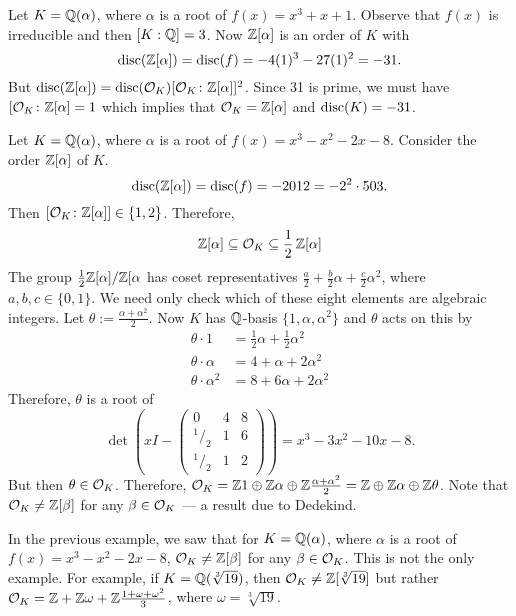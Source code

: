 \begin{ex}
Let $K=\mathbb{Q}(\alpha)$, where $\alpha$ is a root of $f(x)=x^3+x+1$. Observe that $f(x)$ is irreducible and then $[K:\mathbb{Q}]=3$. Now $\mathbb{Z}[\alpha]$ is an order of $K$ with 
	\[
	\operatorname{disc}(\mathbb{Z}[\alpha])= \operatorname{disc}(f)= -4(1)^3 - 27(1)^2= -31.
	\]
But $\operatorname{disc}(\mathbb{Z}[\alpha])= \operatorname{disc}(\mathcal{O}_K) [\mathcal{O}_K \colon \mathbb{Z}[\alpha]]^2$. Since 31 is prime, we must have $[\mathcal{O}_K \colon \mathbb{Z}[\alpha]=1$ which implies that $\mathcal{O}_K=\mathbb{Z}[\alpha]$ and $\operatorname{disc}(K)= -31$. \xqed \pskip
\end{ex}


\begin{ex}
Let $K=\mathbb{Q}(\alpha)$, where $\alpha$ is a root of $f(x)= x^3-x^2-2x-8$. Consider the order $\mathbb{Z}[\alpha]$ of $K$. 
	\[
	\operatorname{disc}(\mathbb{Z}[\alpha])= \operatorname{disc}(f)= -2012= -2^2 \cdot 503.
	\]
Then $[\mathcal{O}_K \colon \mathbb{Z}[\alpha]] \in \{1,2\}$. Therefore,
	\[
	\mathbb{Z}[\alpha] \subseteq \mathcal{O}_K \subseteq \dfrac{1}{2} \, \mathbb{Z}[\alpha]
	\]
The group $\frac{1}{2}\mathbb{Z}[\alpha]/\mathbb{Z}[\alpha$ has coset representatives $\frac{a}{2} + \frac{b}{2} \alpha + \frac{c}{2} \alpha^2$, where $a,b,c \in \{0,1\}$. We need only check which of these eight elements are algebraic integers. Let $\theta:= \frac{\alpha + \alpha^2}{2}$. Now $K$ has $\mathbb{Q}$-basis $\{1,\alpha,\alpha^2\}$ and $\theta$ acts on this by
	\[
	\begin{split}
	\theta \cdot 1&= \frac{1}{2} \alpha + \frac{1}{2} \alpha^2 \\
	\theta \cdot \alpha&= 4+\alpha + 2\alpha^2 \\
	\theta \cdot \alpha^2&= 8 + 6\alpha +2\alpha^2
	\end{split}
	\]
Therefore, $\theta$ is a root of 
	\[
	\det\left(xI - 
	\begin{pmatrix}
	0 & 4 & 8 \\
	^1/_2 & 1 & 6 \\
	^1/_2 & 1 & 2 
	\end{pmatrix}
	\right)= x^3 - 3x^2 -10x - 8.
	\]
But then $\theta \in \mathcal{O}_K$. Therefore, $\mathcal{O}_K= \mathbb{Z} 1 \oplus \mathbb{Z} \alpha \oplus \mathbb{Z}\frac{\alpha+\alpha^2}{2}=\mathbb{Z} \oplus \mathbb{Z} \alpha \oplus \mathbb{Z} \theta$. Note that $\mathcal{O}_K \neq \mathbb{Z}[\beta]$ for any $\beta \in \mathcal{O}_K$ --- a result due to Dedekind. \xqed \pskip
\end{ex}


\begin{ex}
In the previous example, we saw that for $K=\mathbb{Q}(\alpha)$, where $\alpha$ is a root of $f(x)=x^3-x^2-2x-8$, $\mathcal{O}_K \neq \mathbb{Z}[\beta]$ for any $\beta \in \mathcal{O}_K$. This is not the only example. For example, if $K=\mathbb{Q}(\sqrt[3]{19})$, then $\mathcal{O}_K \neq \mathbb{Z}[\sqrt[3]{19}]$ but rather $\mathcal{O}_K=\mathbb{Z}+\mathbb{Z}\omega+ \mathbb{Z} \frac{1+\omega+\omega^2}{3}$, where $\omega=\sqrt[3]{19}$. \xqed \pskip
\end{ex}


